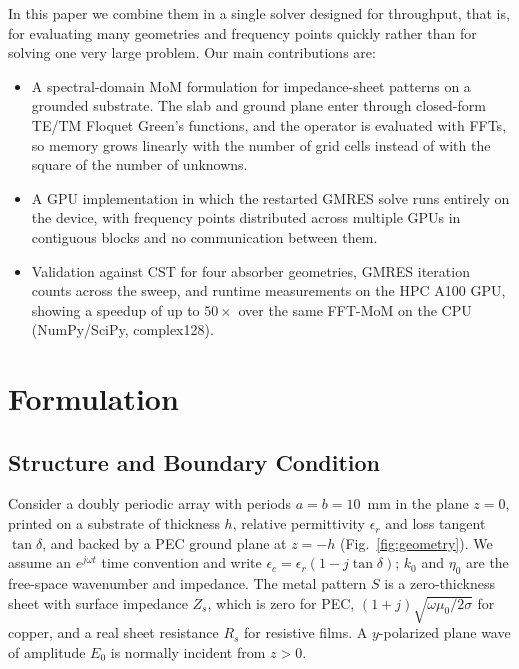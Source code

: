 \documentclass[10pt,conference]{IEEEtran}
\begin{document}
	In this paper we combine them in a single solver designed for throughput,
	that is, for evaluating many geometries and frequency points quickly rather
	than for solving one very large problem. Our main contributions are:
	\begin{itemize}
		\item A spectral-domain MoM formulation for impedance-sheet patterns on a
		grounded substrate. The slab and ground plane enter through closed-form
		TE/TM Floquet Green's functions, and the operator is evaluated with FFTs,
		so memory grows linearly with the number of grid cells instead of with the
		square of the number of unknowns.
		\item A GPU implementation in which the restarted GMRES solve runs entirely
		on the device, with frequency points distributed across multiple GPUs in
		contiguous blocks and no communication between them.
		\item Validation against CST for four absorber geometries, GMRES
		iteration counts across the sweep, and runtime measurements on the HPC
		A100 GPU, showing a speedup of up to $50\times$ over the same FFT-MoM on
		the CPU (NumPy/SciPy, complex128).
	\end{itemize}
	
	\section{Formulation}
	\label{sec:form}
	
	\subsection{Structure and Boundary Condition}
	
	Consider a doubly periodic array with periods $a=b=10$~mm in the plane
	$z=0$, printed on a substrate of thickness $h$, relative permittivity
	$\epsilon_r$ and loss tangent $\tan\delta$, and backed by a PEC ground plane
	at $z=-h$ (Fig.~\ref{fig:geometry}). We assume an $e^{j\omega t}$ time
	convention and write $\epsilon_c=\epsilon_r(1-j\tan\delta)$; $k_0$ and
	$\eta_0$ are the free-space wavenumber and impedance. The metal
	pattern $S$ is a zero-thickness sheet with surface impedance $Z_s$, which is
	zero for PEC, $(1+j)\sqrt{\omega\mu_0/2\sigma}$ for copper, and a real sheet
	resistance $R_s$ for resistive films. A $y$-polarized plane wave of
	amplitude $E_0$ is normally incident from $z>0$.
	
\end{document}
